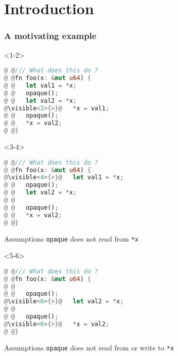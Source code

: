 \begin{frame}
    \titlepage
\end{frame}

\section{Introduction}

\begin{frame}[fragile,t]
    \frametitle{A motivating example}
    \begin{onlyenv}<1-2>
        \begin{block}{}
            \begin{minipage}{\textwidth}
                \begin{lstlisting}[language=rust, escapechar=@]
@ @/// What does this do ?
@ @fn foo(x: &mut u64) {
@ @   let val1 = *x;
@ @   opaque();
@ @   let val2 = *x;
@\visible<2>{>}@   *x = val1;
@ @   opaque();
@ @   *x = val2;
@ @}
                \end{lstlisting}
            \end{minipage}
        \end{block}
    \end{onlyenv}

    \begin{onlyenv}<3-4>
        \begin{block}{}
            \begin{minipage}{\textwidth}
                \begin{lstlisting}[language=rust, escapechar=@]
@ @/// What does this do ?
@ @fn foo(x: &mut u64) {
@\visible<4>{>}@   let val1 = *x;
@ @   opaque();
@ @   let val2 = *x;
@ @
@ @   opaque();
@ @   *x = val2;
@ @}
                \end{lstlisting}
            \end{minipage}
        \end{block}
        \begin{block}{Assumptions}
            \texttt{opaque} does not read from \texttt{*x}
        \end{block}
    \end{onlyenv}

    \begin{onlyenv}<5-6>
        \begin{block}{}
            \begin{minipage}{\textwidth}
                \begin{lstlisting}[language=rust, escapechar=@]
@ @/// What does this do ?
@ @fn foo(x: &mut u64) {
@ @
@ @   opaque();
@\visible<6>{>}@   let val2 = *x;
@ @
@ @   opaque();
@\visible<6>{>}@   *x = val2;
@ @}
                \end{lstlisting}
            \end{minipage}
        \end{block}
        \begin{block}{Assumptions}
            \texttt{opaque} does not read from or write to \texttt{*x}
        \end{block}
    \end{onlyenv}


\end{frame}

